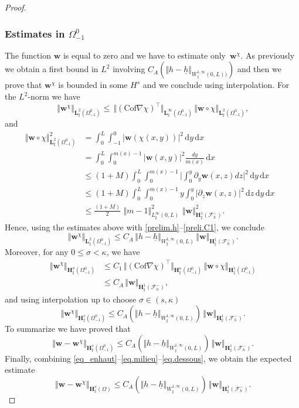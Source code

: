 \documentclass[JEP,XML,SOM,Unicode,NoFloatCountersInSection]{cedram}
\let\mathcal\mathscr
\theoremstyle{remark}
\theoremstyle{definition}
\newcommand{\norme}[1]{\,\Vert #1\Vert}
\newcommand{\vnorme}[1]{\Vert #1\Vert}
\newcommand{\bnorme}[1]{\,\bigl\Vert #1\bigr\Vert}
\newcommand{\dd}{\,\mathrm{d}}
\newcommand{\wg}{\boldsymbol{w}}
\newcommand{\BS}[1]{\boldsymbol{#1}}
\let\CM\Omega
\newcommand{\hb}{{\underline{h}}}
\newcommand{\Cof}{\mathrm{Cof}}
\begin{document}
\begin{proof}
\subsubsection*{Estimates in $\Omega_{-1}^{0}$} The function $\wg$ is equal to zero and we have to estimate only~$\wg^\chi$. As previously we obtain a first bound in $L^{2}$ involving $C_A(\vnorme{h-\hb}_{W^{1,\infty}_{\sharp}(0,L))})$ and then we prove that $\wg^\chi$ is bounded in some $H^{s}$ and we conclude using interpolation. For the $L^{2}$-norm we have
\[
\norme{\wg^\chi}_{\BS{L}^{2}_{\sharp}(\Omega_{-1}^{0})}\leq \norme{(\Cof\nabla\chi)^{\top}}_{\BS{L}^{\infty}_{\sharp}(\Omega_{-1}^{0})}\norme{\wg\circ\chi}_{\BS{L}^{2}_{\sharp}(\Omega_{-1}^{0})},
\]
and
\[
\begin{aligned}
\norme{\wg\circ\chi}^2_{\BS{L}^{2}_{\sharp}(\Omega_{-1}^{0})}&=\int_{0}^{L}\int_{-1}^{0}\vert \wg(\chi(x,y))\vert^{2}\dd y\dd x&{}\\
&=\int_{0}^{L}\int_{0}^{m(x)-1}\vert \wg(x,y)\vert^{2}\frac{dy}{m(x)}\dd x\\
&\leq (1+M)\int_{0}^{L}\int_{0}^{m(x)-1}\biggl\vert\int_{0}^{y}\partial_y\wg(x,z)dz\biggr\vert^{2}\dd y\dd x\\
&\leq (1+M)\int_{0}^{L}\int_{0}^{m(x)-1}y\int_{0}^{y}\vert\partial_z\wg(x,z)\vert^{2}\dd z\dd y\dd x\\
&\leq \frac{(1+M)}{2}\,\norme{m-1}_{L^{\infty}_{\sharp}(0,L)}^{2}\,\norme{\wg}_{\BS{H}^{1}_{\sharp}(\mathcal{F}^{-}_{h})}^{2}.
\end{aligned}
\]
Hence, using the estimates above with \eqref{prelim.h}--\eqref{preli.C1}, we conclude
\[\norme{\wg^\chi}_{\BS{L}^{2}_{\sharp}(\Omega_{-1}^{0})}\leq C_A\norme{h-\hb}_{W^{1,\infty}_{\sharp}(0,L)}\norme{\wg}_{\BS{H}^{1}_{\sharp}(\mathcal{F}^{-}_{h})}.
\]
Moreover, for any $0\leq \sigma<\kappa$, we have
\[
\begin{aligned}
\norme{\wg^\chi}_{\BS{H}^{\sigma}_{\sharp}(\Omega_{-1}^{0})}&{}\leq C_{1}\bnorme{(\Cof\nabla\chi)^{\top}}_{\BS{H}^{\kappa}_{\sharp}(\Omega_{-1}^{0})}\norme{\wg\circ\chi}_{\BS{H}^{1}_{\sharp}(\Omega_{-1}^{0})}\\
&\leq C_A\norme{\wg}_{\BS{H}^{1}_{\sharp}(\mathcal{F}^{-}_{h})},
\end{aligned}
\]
and using interpolation up to choose $\sigma \in (s,\kappa)$
\[\norme{\wg^\chi}_{\BS{H}^{s}_{\sharp}(\Omega_{-1}^{0})}\leq C_A(\vnorme{h-\hb}_{W^{1,\infty}_{\sharp}(0,L)})\norme{\wg}_{\BS{H}^{1}_{\sharp}(\mathcal{F}^{-}_{h})}.\]
To summarize we have proved that
\begin{equation} \label{eq.dessous}
\norme{\wg-\wg^\chi}_{\BS{H}^{s}_{\sharp}(\Omega_{-1}^0)}\leq C_A(\vnorme{h-\hb}_{W^{1,\infty}_{\sharp}(0,L)})\norme{\wg}_{\BS{H}^{1}_{\sharp}(\mathcal{F}^{-}_{h})}.
\end{equation}
Finally, combining \eqref{eq_enhaut}--\eqref{eq.milieu}--\eqref{eq.dessous}, we obtain the expected estimate
\begin{equation} \label{eq.total}
\norme{\wg-\wg^\chi}_{\BS{H}^{s}_{\sharp}(\CM)}\leq C_A(\vnorme{h-\hb}_{W^{1,\infty}_{\sharp}(0,L)})\norme{\wg}_{\BS{H}^{1}_{\sharp}(\mathcal{F}^{-}_{h})}.
\end{equation}


\end{proof}
\end{document}
